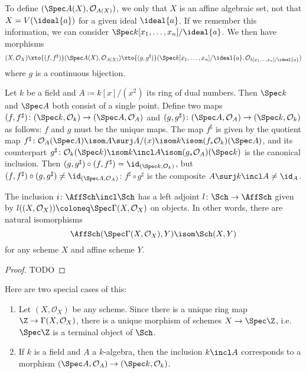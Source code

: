 \documentclass[wip, algebra]{bsteffan-lecturenotes}
\newcommand{\cO}{\mathcal{O}}
\begin{document}
\begin{remark}
	To define $(\Spec A(X), \cO_{A(X)})$, we only that $X$ is an affine algebraic set, not that $X = V(\ideal{a})$ for a given ideal $\ideal{a}$.
	If we remember this information, we can consider $\Spec k[x_1, \ldots, x_n] / \ideal{a}$.
	We then have morphisms
	\begin{equation*}
		(X, \cO_X) \xto{(f, f^\sharp)} (\Spec A(X), \cO_{A(X)}) \xto{(g, g^\sharp)} (\Spec k[x_1, \ldots, x_n] / \ideal{a}, \cO_{k[x_1, \ldots, x_n] / \ideal{a}})
	\end{equation*}
	where $g$ is a continuous bijection.
\end{remark}
\begin{example}
	Let $k$ be a field and $A \coloneq k[x] / (x^2)$ its ring of dual numbers.
	Then $\Spec k$ and $\Spec A$ both consist of a single point.
	Define two maps $(f, f^\sharp)\colon (\Spec k, \cO_{k}) \to (\Spec A, \cO_{A})$ and $(g, g^\sharp)\colon (\Spec A, \cO_{A}) \to (\Spec k, \cO_k)$ as follows:
	$f$ and $g$ must be the unique maps. 
	The map $f^\sharp$ is given by the quotient map $f^\sharp\colon \cO_A(\Spec A) \isom A \surj A / (x) \isom k \isom (f_* \cO_k)(\Spec A)$, and its counterpart $g^\sharp\colon \cO_k(\Spec k) \isom k \incl A \isom (g_* \cO_A)(\Spec k)$ is the canonical inclusion.
	Then $(g, g^\sharp) \circ (f, f^\sharp) = \id_{(\Spec k, \cO_k)}$, but $(f, f^\sharp) \circ (g, g^\sharp) \neq \id_{(\Spec A, \cO_A)}$: $f^\sharp \circ g^\sharp$ is the composite $A \surj k \incl A \neq \id_A$.
\end{example}
\begin{proposition}\label{prp:affinclleftadj}
	The inclusion $i\colon \AffSch \incl \Sch$ has a left adjoint $l\colon \Sch \to \AffSch$ given by $l((X, \cO_X)) \coloneq \Spec \Gamma(X, \cO_X)$ on objects.
	In other words, there are natural isomorphisms
	\begin{equation*}
		\AffSch(\Spec \Gamma(X, \cO_X), Y) \isom \Sch(X, Y)
	\end{equation*}
	for any scheme $X$ and affine scheme $Y$.
\end{proposition}
\begin{proof}
	TODO
\end{proof}
Here are two special cases of this:
\begin{example}
	\leavevmode
	\begin{enumerate}
		\item Let $(X, \cO_X)$ be any scheme.
			Since there is a unique ring map $\Z \to \Gamma(X, \cO_X)$, there is a unique morphism of schemes $X \to \Spec \Z$, i.e. $\Spec \Z$ is a terminal object of $\Sch$.
		\item If $k$ is a field and $A$ a $k$-algebra, then the inclusion $k \incl A$ corresponds to a morphism $(\Spec A, \cO_A) \to (\Spec k, \cO_k)$.
	\end{enumerate}
\end{example}
\end{document}
